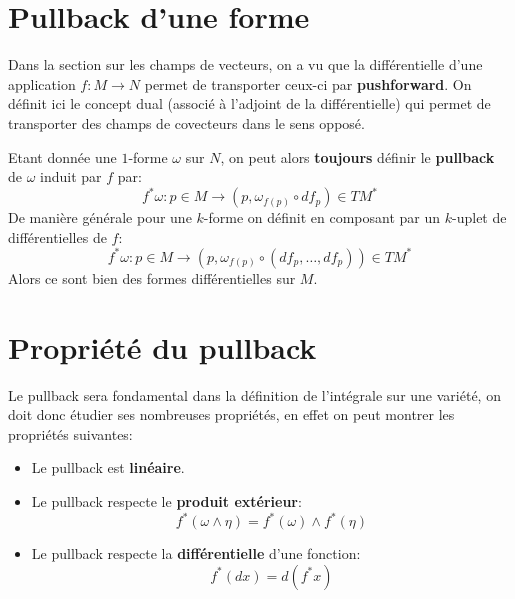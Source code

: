    \section{Pullback d'une forme}
   Dans la section sur les champs de vecteurs, on a vu que la différentielle d'une application \( f : M \longrightarrow N \) permet de transporter ceux-ci par \textbf{pushforward}. On définit ici le concept dual (associé à l'adjoint de la différentielle) qui permet de transporter des champs de covecteurs dans le sens opposé.\<

   Etant donnée une \( 1 \)-forme \( \omega \) sur \( N \), on peut alors \textbf{toujours} définir le \textbf{pullback} de \( \omega \) induit par \( f \) par:
   \[ 
      f^*\omega : p \in M \longrightarrow (p, \omega_{f(p)} \circ df_p) \in TM^*
   \]   
   De manière générale pour une \( k \)-forme on définit en composant par un \( k \)-uplet de différentielles de \( f \):
   \[ 
      f^*\omega : p \in M \longrightarrow (p, \omega_{f(p)} \circ (df_p, \ldots, df_p)) \in TM^*
   \]
   Alors ce sont bien des formes différentielles sur \( M \). 
   
   \section{Propriété du pullback}
      Le pullback sera fondamental dans la définition de l'intégrale sur une variété, on doit donc étudier ses nombreuses propriétés, en effet on peut montrer les propriétés suivantes:
      \begin{itemize}
         \item Le pullback est \textbf{linéaire}.
         \item Le pullback respecte le \textbf{produit extérieur}:
         \[ 
            f^*(\omega \wedge \eta) = f^*(\omega) \wedge f^*(\eta)
         \]
         \item Le pullback respecte la \textbf{différentielle} d'une fonction:
         \[ 
            f^*(dx) = d(f^*x)
         \]
      \end{itemize}
